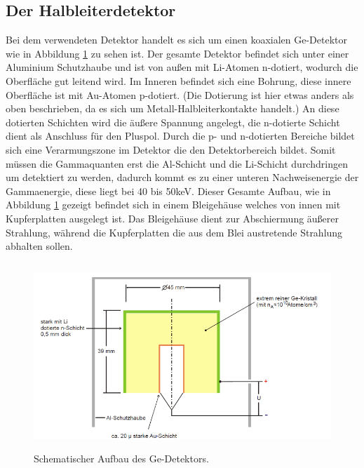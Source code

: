 \subsection{Der Halbleiterdetektor}
Bei dem verwendeten Detektor handelt es sich um einen koaxialen Ge-Detektor wie in Abbildung
\ref{fig:Aufbau} zu sehen ist. Der gesamte Detektor befindet sich unter einer Aluminium
Schutzhaube und ist von außen mit Li-Atomen n-dotiert, wodurch die Oberfläche
gut leitend wird. Im Inneren befindet sich eine Bohrung, diese innere Oberfläche ist
mit Au-Atomen p-dotiert. (Die Dotierung ist hier etwas anders als oben beschrieben, da es sich um
Metall-Halbleiterkontakte handelt.) An diese dotierten Schichten wird die
äußere Spannung angelegt, die n-dotierte Schicht dient als Anschluss für den Pluspol.
Durch die p- und n-dotierten Bereiche bildet sich eine
Verarmungszone im Detektor die den Detektorbereich bildet. Somit müssen die Gammaquanten erst
die Al-Schicht und die Li-Schicht durchdringen um detektiert zu werden, dadurch kommt es zu einer
unteren Nachweisenergie der Gammaenergie, diese liegt bei 40 bis 50\;keV.
Dieser Gesamte Aufbau, wie in Abbildung \ref{fig:Aufbau} gezeigt befindet sich in einem
Bleigehäuse welches von innen mit Kupferplatten ausgelegt ist. Das Bleigehäuse dient zur Abschiermung
äußerer Strahlung, während die Kupferplatten die aus dem Blei austretende Strahlung
abhalten sollen.

\begin{figure}
  \centering
  \includegraphics[height=7cm]{Aufbau.png}
  \caption{Schematischer Aufbau des Ge-Detektors. \cite{skript}}
  \label{fig:Aufbau}
\end{figure}

